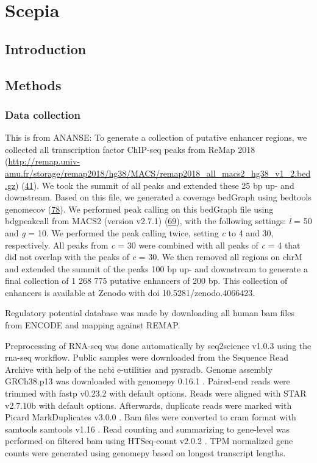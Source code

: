 \chapter{Scepia}\thumbforchapter
{}
\newpage

\section{Introduction}

\section{Methods}

\subsection{Data collection}

This is from ANANSE:
To generate a collection of putative enhancer regions, we collected all transcription factor ChIP-seq peaks from ReMap 2018 (\href{http://remap.univ-amu.fr/storage/remap2018/hg38/MACS/remap2018_all_macs2_hg38_v1_2.bed.gz}{http://remap.univ-amu.fr/storage/remap2018/hg38/MACS/remap2018\_all\_macs2\_hg38\_v1\_2.bed.gz}) (\href{javascript:;}{41}). We took the summit of all peaks and extended these 25 bp up- and downstream. Based on this file, we generated a coverage bedGraph using bedtools genomecov (\href{javascript:;}{78}). We performed peak calling on this bedGraph file using bdgpeakcall from MACS2 (version v2.7.1) (\href{javascript:;}{69}), with the following settings: \textit{l} = 50 and \textit{g} = 10. We performed the peak calling twice, setting \textit{c} to 4 and 30, respectively. All peaks from \textit{c} = 30 were combined with all peaks of \textit{c} = 4 that did not overlap with the peaks of \textit{c} = 30. We then removed all regions on chrM and extended the summit of the peaks 100 bp up- and downstream to generate a final collection of 1 268 775 putative enhancers of 200 bp. This collection of enhancers is available at Zenodo with doi 10.5281/zenodo.4066423.

Regulatory potential database was made by downloading all human bam files from ENCODE and mapping against REMAP.

Preprocessing of RNA-seq was done automatically by seq2science v1.0.3 \cite{seq2science} using the rna-seq workflow. Public samples were downloaded from the Sequence Read Archive \cite{Leinonen2010} with help of the ncbi e-utilities and pysradb\cite{Choudhary2019}. Genome assembly GRCh38.p13 was downloaded with genomepy 0.16.1 \cite{Frlich2023}. Paired-end reads were trimmed with fastp v0.23.2 \cite{Chen2018} with default options. Reads were aligned with STAR v2.7.10b \cite{Dobin2012} with default options. Afterwards, duplicate reads were marked with Picard MarkDuplicates v3.0.0 \cite{picard}. Bam files were converted to cram format with samtools samtools v1.16 \cite{Danecek2021}. Read counting and summarizing to gene-level was performed on filtered bam using HTSeq-count v2.0.2 \cite{Anders2014}. TPM normalized gene counts were generated using genomepy based on longest transcript lengths.


